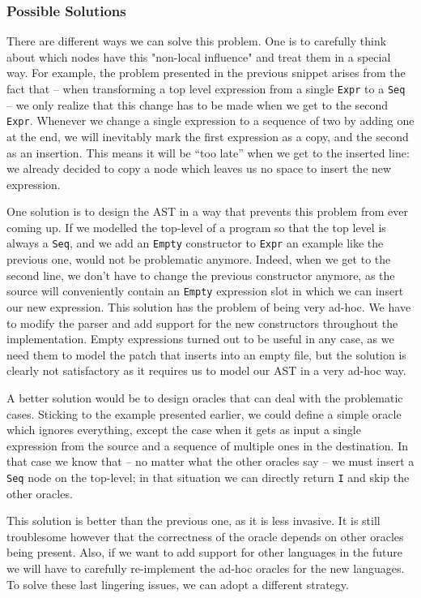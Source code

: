 \documentclass[11pt, titlepage]{article}
\newcommand{\toHaskell}[1]{\texttt{#1}\xspace}
\begin{document}
\subsubsection*{Possible Solutions}
There are different ways we can solve this problem. 
One is to carefully think about which nodes have this "non-local influence" and treat them in a special way. 
For example, the problem presented in the previous snippet arises from the fact that -- when transforming a top level expression from a single \toHaskell{Expr} to a \toHaskell{Seq} -- we only realize that this change has to be made when we get to the second \toHaskell{Expr}. 
Whenever we change a single expression to a sequence of two by adding one at the end, we will inevitably mark the first expression as a copy, and the second as an insertion. This means it will be ``too late'' when we get to the inserted line: we already decided to copy a node which leaves us no space to insert the new expression.

One solution is to design the AST in a way that prevents this problem from ever coming up. If we modelled the top-level of a program so that the top level is always a \toHaskell{Seq}, and we add an \toHaskell{Empty} constructor to \toHaskell{Expr} an example like the previous one, would not be problematic anymore. 
Indeed, when we get to the second line, we don't have to change the previous constructor anymore, as the source will conveniently contain an \toHaskell{Empty} expression slot in which we can insert our new expression.
This solution has the problem of being very ad-hoc. We have to modify the parser and add support for the new constructors throughout the implementation. Empty expressions turned out to be useful in any case, as we need them to model the patch that inserts into an empty file, but the solution is clearly not satisfactory as it requires us to model our AST in a very ad-hoc way.

A better solution would be to design oracles that can deal with the problematic cases. 
Sticking to the example presented earlier, we could define a simple oracle which ignores everything, except the case when it gets as input a single expression from the source and a sequence of multiple ones in the destination. In that case we know that -- no matter what the other oracles say -- we must insert a \toHaskell{Seq} node on the top-level; in that situation we can directly return \toHaskell{I} and skip the other oracles. 

This solution is better than the previous one, as it is less invasive. It is still troublesome however that the correctness of the oracle depends on other oracles being present. Also, if we want to add support for other languages in the future we will have to carefully re-implement the ad-hoc oracles for the new languages. To solve these last lingering issues, we can adopt a different strategy. 
\end{document}
